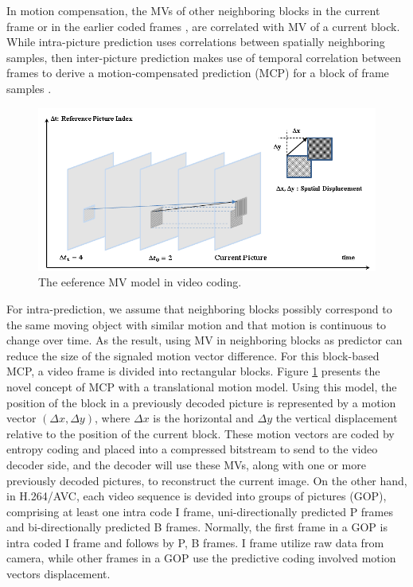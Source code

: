   In  motion compensation, the MVs of other neighboring blocks in the current frame or in the earlier coded frames \cite{laroche2008rd}, \cite{jiang2019spatial} are correlated with MV of a current block. While intra-picture prediction uses correlations between spatially neighboring samples, then inter-picture prediction makes use of temporal correlation between frames to derive a motion-compensated prediction (MCP) for a block of frame samples \cite{bross2014inter}.
\begin{figure}
\centering
 \includegraphics[width=1.0\linewidth]{Figures/mv.png}
 \caption{ The eeference MV model in video coding.}
 \label{fig:mv}
\end{figure}
For intra-prediction, we assume that neighboring blocks possibly correspond to the same moving object with similar motion and that motion  is continuous to change over time. As the result, using MV in neighboring blocks as predictor can reduce the size of the signaled motion vector difference. For this block-based MCP, a video frame is divided into rectangular blocks. Figure \ref{fig:mv} presents the novel concept of MCP with a translational motion model. Using this model, the position of the block in a previously decoded picture is represented by a motion vector $(\Delta x, \Delta y)$, where $\Delta x$ is the horizontal and $\Delta y$ the vertical displacement relative to the position of the current block. These motion vectors are coded by entropy coding and placed into a compressed bitstream to send to the video decoder side,  and the decoder will use these MVs, along with one or more previously decoded pictures, to reconstruct the current image. On the other hand, in H.264/AVC, each video sequence is devided into groups of pictures (GOP), comprising at least one intra code I frame, uni-directionally predicted P frames and bi-directionally predicted B frames. Normally, the first frame in a GOP is intra coded I frame and follows by P, B frames. I frame utilize raw data from camera, while other frames in a GOP use the predictive coding involved motion vectors displacement. \\
